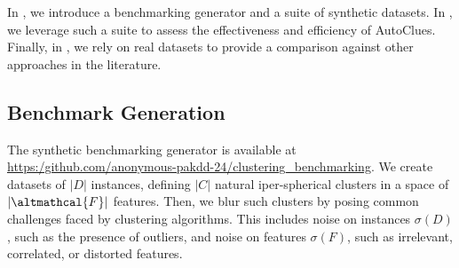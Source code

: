 
In , we introduce a benchmarking generator and a suite of synthetic datasets. In , we leverage such a suite to assess the effectiveness and efficiency of AutoClues.
Finally, in , we rely on real datasets to provide a comparison against other approaches in the literature.

\vspace{-0.2cm}
\subsection{Benchmark Generation}
\label{clustering-ssec:benchmark}
The synthetic benchmarking generator is available at \url{https:/github.com/anonymous-pakdd-24/clustering_benchmarking}.
We create datasets of $|D|$ instances, defining $|C|$ natural iper-spherical clusters in a space of $|\altmathcal{F}|$ features.
Then, we blur such clusters by posing common challenges faced by clustering algorithms. 
This includes noise on instances $\sigma(D)$, such as the presence of outliers, and
noise on features $\sigma(F)$, such as irrelevant, correlated, or distorted features.

